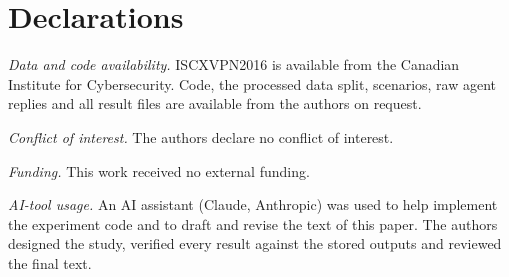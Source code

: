 \documentclass[conference]{IEEEtran}
\begin{document}
\section*{Declarations}

\textit{Data and code availability.} ISCXVPN2016 is available from the Canadian Institute for Cybersecurity. Code, the processed data split, scenarios, raw agent replies and all result files are available from the authors on request.

\textit{Conflict of interest.} The authors declare no conflict of interest.

\textit{Funding.} This work received no external funding.

\textit{AI-tool usage.} An AI assistant (Claude, Anthropic) was used to help implement the experiment code and to draft and revise the text of this paper. The authors designed the study, verified every result against the stored outputs and reviewed the final text.



\end{document}
